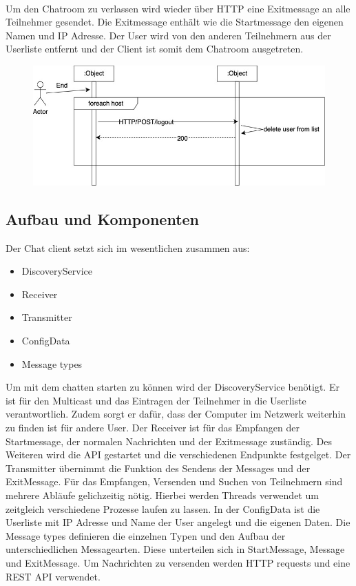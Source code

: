 \\
Um den Chatroom zu verlassen wird wieder über HTTP eine Exitmessage an alle Teilnehmer gesendet. Die Exitmessage enthält wie die Startmessage den eigenen Namen und IP Adresse.
Der User wird von den anderen Teilnehmern aus der Userliste entfernt und der Client ist somit dem Chatroom ausgetreten. 
\begin{figure}[ht]
    \centering
    \includegraphics[scale=0.4]{Images/Exit_Sequenzdiagramm.jpg}
\end{figure}
\newpage
\subsection{Aufbau und Komponenten} %
Der Chat client setzt sich im wesentlichen zusammen aus:
\begin{itemize}
    \item DiscoveryService
    \item Receiver
    \item Transmitter
    \item ConfigData
    \item Message types
\end{itemize} 
Um mit dem chatten starten zu können wird der DiscoveryService benötigt. 
Er ist für den Multicast und das Eintragen der Teilnehmer in die Userliste verantwortlich. Zudem sorgt er dafür, dass der Computer im Netzwerk weiterhin zu finden ist für andere User.
Der Receiver ist für das Empfangen der Startmessage, der normalen Nachrichten und der Exitmessage zuständig. Des Weiteren wird die API gestartet und die verschiedenen Endpunkte festgelget.
Der Transmitter übernimmt die Funktion des Sendens der Messages und der ExitMessage. 
Für das Empfangen, Versenden und Suchen von Teilnehmern sind mehrere Abläufe gelichzeitig nötig. Hierbei werden Threads verwendet um zeitgleich verschiedene Prozesse laufen zu lassen.
In der ConfigData ist die Userliste mit IP Adresse und Name der User angelegt und die eigenen Daten.
Die Message types definieren die einzelnen Typen und den Aufbau der unterschiedlichen Messagearten. Diese unterteilen sich in StartMessage, Message und ExitMessage.
Um Nachrichten zu versenden werden HTTP requests und eine REST API verwendet. 

